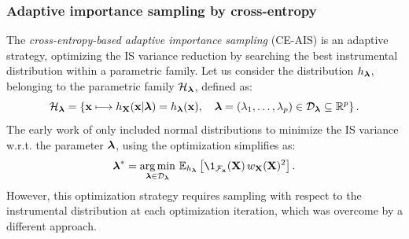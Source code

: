 \subsubsection{Adaptive importance sampling by cross-entropy}

The \textit{cross-entropy-based adaptive importance sampling} (CE-AIS) is an adaptive strategy, optimizing the IS variance reduction by searching the best instrumental distribution within a parametric family. 
Let us consider the distribution $h_{{\boldsymbol{\lambda}}}$, belonging to the parametric family $\mathcal{H}_{\boldsymbol{\lambda}}$, defined as: 
\begin{equation}
    \mathcal{H}_{\boldsymbol{\lambda}} = \left\{{\bf x} \longmapsto h_{\bf X}({\bf x} | {\boldsymbol{\lambda}}) = h_{{\boldsymbol{\lambda}}}({\bf x}), \quad {\boldsymbol{\lambda}} = (\lambda_1, \dots, \lambda_p) \in \mathcal{D}_{\boldsymbol{\lambda}} \subseteq \mathbb{R}^p\right\}.
\end{equation} 
The early work of \citet{bucher_1988_AIS} only included normal distributions to minimize the IS variance w.r.t. the parameter ${\boldsymbol{\lambda}}$, using  the optimization simplifies as:
\begin{equation}
    \blambda^* = \argmin_{\blambda \in \iD_\blambda} \, \E_{h_\blambda}\left[ \1_{\iF_\bx}(\bX) \, w_\bX(\bX)^2 \right]. 
\end{equation}
However, this optimization strategy requires sampling with respect to the instrumental distribution at each optimization iteration, which was overcome by a different approach. 

